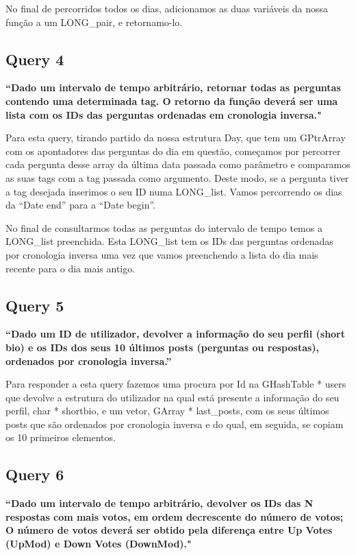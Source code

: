 \documentclass[a4paper]{report}
\begin{document}
No final de percorridos todos os dias, adicionamos as duas variáveis da nossa função a um LONG\_pair, e retornamo-lo.


\subsection*{Query 4}
\label{sec:query4}

\textbf{“Dado um intervalo de tempo arbitrário, retornar todas as perguntas contendo uma determinada tag.
O retorno da função deverá ser uma lista com os IDs das perguntas ordenadas em cronologia inversa."}

Para esta query, tirando partido da nossa estrutura Day, que tem um GPtrArray com
os apontadores das perguntas do dia em questão, começamos por percorrer cada pergunta desse array
da última data passada como parâmetro e comparamos as suas tags com a tag passada como argumento.
Deste modo, se a pergunta tiver a tag desejada inserimos o seu ID numa LONG\_list.
Vamos percorrendo os dias da “Date end” para a “Date begin”.

No final de consultarmos todas as perguntas do intervalo de tempo temos a LONG\_list preenchida.
Esta LONG\_list tem os IDs das perguntas ordenadas por cronologia inversa uma vez que
vamos preenchendo a lista do dia mais recente para o dia mais antigo.



\subsection*{Query 5}
\label{sec:query5}

\textbf{“Dado um ID de utilizador,  devolver a informação do
seu perfil (short bio) e os IDs dos seus 10 últimos posts (perguntas ou respostas),
ordenados por cronologia inversa.”}

Para responder a esta query fazemos uma procura por Id na GHashTable * users que devolve
a estrutura do utilizador na qual está presente a informação do
seu perfil, char * shortbio, e um vetor, GArray * last\_posts, com os seus últimos posts que são
ordenados por cronologia inversa e do qual, em seguida, se copiam os 10 primeiros
elementos.

\subsection*{Query 6}
\label{sec:query6}

\textbf{“Dado um intervalo de tempo arbitrário, devolver os IDs das N respostas
com mais votos, em ordem decrescente do número de votos; O número de votos deverá
ser obtido pela diferença entre Up Votes (UpMod) e Down Votes (DownMod)."}
\end{document}
